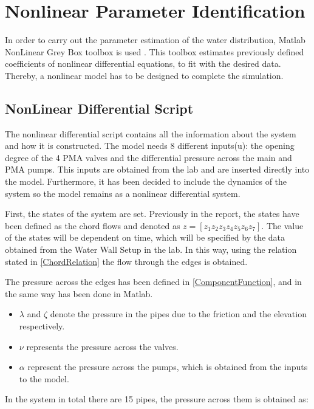 \section{Nonlinear Parameter Identification} 
\label{MatlabScript}

In order to carry out the parameter estimation of the water distribution, Matlab NonLinear Grey Box toolbox is used \cite{MatlabGreyBox}. This toolbox 
estimates previously defined coefficients of nonlinear differential equations, to fit with the desired data. 
Thereby, a nonlinear model has to be designed to complete the simulation. 

\subsection{NonLinear Differential Script}
\label{NLDS}
The nonlinear differential script contains all the information about the system and how it is constructed. The model needs 8 different inputs(u): 
the opening degree of the 4 PMA valves and the differential pressure across the main and PMA pumps. This inputs are obtained from the lab and are 
inserted directly into the model. Furthermore, it has been decided to include the dynamics of the system so the model remains as a nonlinear differential system. 

First, the states of the system are set. Previously in the report, the states have been defined as the chord flows and denoted as $z = [z_1 z_2 z_3 z_4 z_5 z_6 
z_7]$. The value of the states will be dependent on time, which will be specified by the data obtained from the Water Wall Setup in the lab. In this way, using
the relation stated in \eqref{ChordRelation} the flow through the edges is obtained.

The pressure across the edges has been defined in \eqref{ComponentFunction}, and in the same way has been done in Matlab. 

\begin{itemize}
  \item $\lambda$ and $\zeta$ denote the pressure in the pipes due to the friction and the elevation respectively.
  \item $\nu$ represents the pressure across the valves.
  \item $\alpha$ represent the pressure across the pumps, which is obtained from the inputs to the model.
\end{itemize}

In the system in total there are 15 pipes, the pressure across them is obtained as: 

